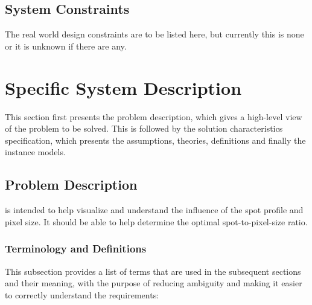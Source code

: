\documentclass[12pt]{article}
\begin{document}
\subsection{System Constraints}

The real world design constraints are to be listed here, but currently this is none or it is unknown if there are any.

\section{Specific System Description}

This section first presents the problem description, which gives a high-level
view of the problem to be solved.  This is followed by the solution characteristics
specification, which presents the assumptions, theories, definitions and finally
the instance models.

\subsection{Problem Description} \label{Sec_pd}

\progname{} is intended to help visualize and understand the influence of the 
spot profile and pixel size. It should be able to help determine the optimal 
spot-to-pixel-size ratio.

\subsubsection{Terminology and Definitions}

This subsection provides a list of terms that are used in the subsequent
sections and their meaning, with the purpose of reducing ambiguity and making it
easier to correctly understand the requirements:
\end{document}

